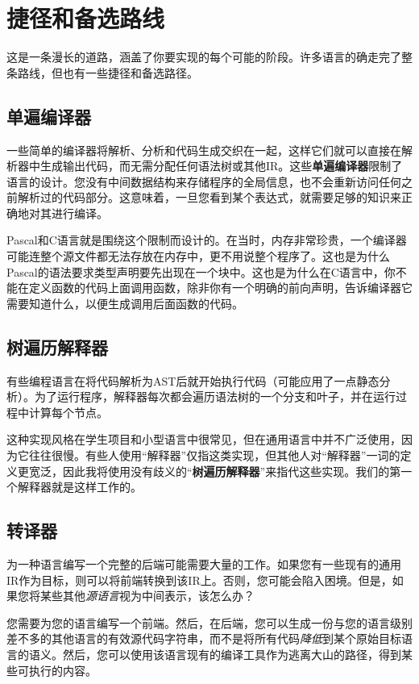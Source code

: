 \documentclass[cn,11pt,chinese]{elegantbook}
\begin{document}
\section{捷径和备选路线}

这是一条漫长的道路，涵盖了你要实现的每个可能的阶段。许多语言的确走完了整条路线，但也有一些捷径和备选路径。

\subsection{单遍编译器}

一些简单的编译器将解析、分析和代码生成交织在一起，这样它们就可以直接在解析器中生成输出代码，而无需分配任何语法树或其他IR。这些\textbf{单遍编译器}限制了语言的设计。您没有中间数据结构来存储程序的全局信息，也不会重新访问任何之前解析过的代码部分。这意味着，一旦您看到某个表达式，就需要足够的知识来正确地对其进行编译。

Pascal和C语言就是围绕这个限制而设计的。在当时，内存非常珍贵，一个编译器可能连整个源文件都无法存放在内存中，更不用说整个程序了。这也是为什么Pascal的语法要求类型声明要先出现在一个块中。这也是为什么在C语言中，你不能在定义函数的代码上面调用函数，除非你有一个明确的前向声明，告诉编译器它需要知道什么，以便生成调用后面函数的代码。

\subsection{树遍历解释器}

有些编程语言在将代码解析为AST后就开始执行代码（可能应用了一点静态分析）。为了运行程序，解释器每次都会遍历语法树的一个分支和叶子，并在运行过程中计算每个节点。

这种实现风格在学生项目和小型语言中很常见，但在通用语言中并不广泛使用，因为它往往很慢。有些人使用“解释器”仅指这类实现，但其他人对“解释器”一词的定义更宽泛，因此我将使用没有歧义的“\textbf{树遍历解释器}”来指代这些实现。我们的第一个解释器就是这样工作的。

\subsection{转译器}

为一种语言编写一个完整的后端可能需要大量的工作。如果您有一些现有的通用IR作为目标，则可以将前端转换到该IR上。否则，您可能会陷入困境。但是，如果您将某些其他\textit{源语言}视为中间表示，该怎么办？

您需要为您的语言编写一个前端。然后，在后端，您可以生成一份与您的语言级别差不多的其他语言的有效源代码字符串，而不是将所有代码\textit{降低}到某个原始目标语言的语义。然后，您可以使用该语言现有的编译工具作为逃离大山的路径，得到某些可执行的内容。
\end{document}
